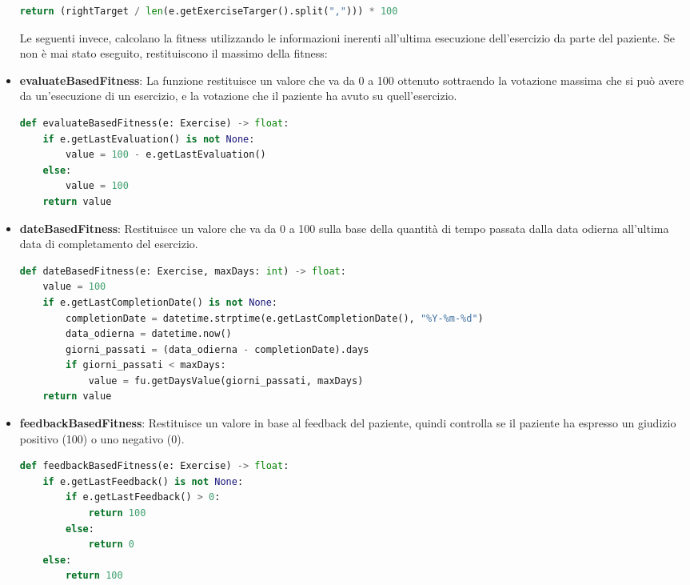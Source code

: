 \documentclass{article}
\begin{document}
\begin{itemize}
\begin{lstlisting}[language = Python]
    return (rightTarget / len(e.getExerciseTarger().split(","))) * 100
\end{lstlisting}

\pagebreak

Le seguenti invece, calcolano la fitness utilizzando le informazioni inerenti all'ultima esecuzione dell'esercizio da parte del paziente. Se non è mai stato eseguito, restituiscono il massimo della fitness:


\item\textbf{evaluateBasedFitness}: La funzione restituisce un valore che va da 0 a 100 ottenuto sottraendo la votazione massima che si può avere da un'esecuzione di un esercizio, e la votazione che il paziente ha avuto su quell'esercizio.
\begin{lstlisting}[language = Python]
    def evaluateBasedFitness(e: Exercise) -> float:
    if e.getLastEvaluation() is not None:
        value = 100 - e.getLastEvaluation()
    else:
        value = 100
    return value
\end{lstlisting}

\item\textbf{dateBasedFitness}: Restituisce un valore che va da 0 a 100 sulla base della quantità di tempo passata dalla data odierna all'ultima data di completamento del esercizio.
\begin{lstlisting}[language = Python]
    def dateBasedFitness(e: Exercise, maxDays: int) -> float:
    value = 100
    if e.getLastCompletionDate() is not None:
        completionDate = datetime.strptime(e.getLastCompletionDate(), "%Y-%m-%d")
        data_odierna = datetime.now()
        giorni_passati = (data_odierna - completionDate).days
        if giorni_passati < maxDays:
            value = fu.getDaysValue(giorni_passati, maxDays)
    return value
\end{lstlisting}


\item\textbf{feedbackBasedFitness}: Restituisce un valore in base al feedback del paziente, quindi controlla se il paziente ha espresso un giudizio positivo (100) o uno negativo (0).
\begin{lstlisting}[language = Python]
    def feedbackBasedFitness(e: Exercise) -> float:
    if e.getLastFeedback() is not None:
        if e.getLastFeedback() > 0:
            return 100
        else:
            return 0
    else:
        return 100
\end{lstlisting}


\end{itemize}
\end{document}
